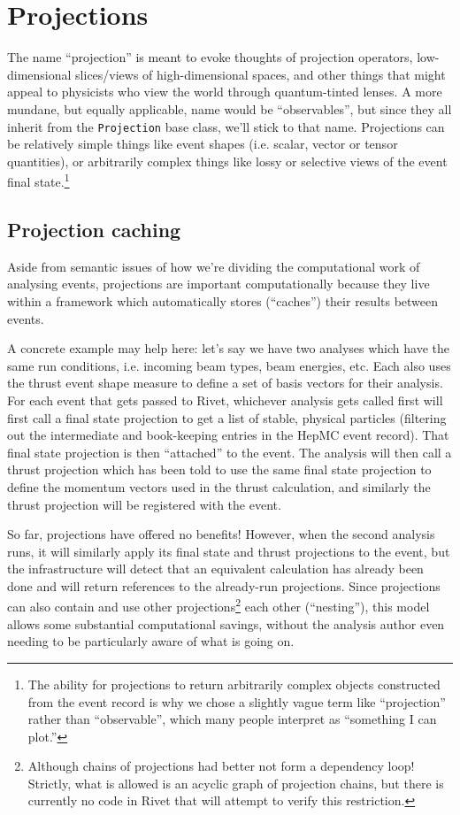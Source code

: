 \documentclass{JHEP3}
\newcommand{\kbd}[1]{\texttt{#1}\xspace}
\begin{document}
\section{Projections}
The name ``projection'' is meant to evoke thoughts of
projection operators, low-dimensional slices/views of high-dimensional spaces,
and other things that might appeal to physicists who view the world through
quantum-tinted lenses. A more mundane, but equally applicable, name would be
``observables'', but since they all inherit from the \kbd{Projection} base
class, we'll stick to that name. Projections can be relatively simple things
like event shapes (i.e. scalar, vector or tensor quantities), or arbitrarily
complex things like lossy or selective views of the event final
state.\footnote{The ability for projections to return arbitrarily complex objects
  constructed from the event record is why we chose a slightly vague term like
  ``projection'' rather than ``observable'', which many people interpret as
  ``something I can plot.''}

\subsection{Projection caching}
Aside from semantic issues of how we're dividing the computational work of
analysing events, projections are important computationally because they live
within a framework which automatically stores (``caches'') their results between
events.

A concrete example may help here: let's say we have two analyses which
have the same run conditions, i.e. incoming beam types, beam energies, etc. Each
also uses the thrust event shape measure to define a set of basis vectors for
their analysis. For each event that gets passed to Rivet, whichever analysis
gets called first will first call a final state projection to get a list of
stable, physical particles (filtering out the intermediate and book-keeping
entries in the HepMC event record). That final state projection is then
``attached'' to the event. The analysis will then call a thrust projection which
has been told to use the same final state projection to define the momentum
vectors used in the thrust calculation, and similarly the thrust projection will
be registered with the event.

So far, projections have offered no benefits! However, when the second analysis
runs, it will similarly apply its final state and thrust projections to the
event, but the infrastructure will detect that an equivalent calculation has
already been done and will return references to the already-run
projections. Since projections can also contain and use other
projections\footnote{Although chains of projections had better not form a
  dependency loop! Strictly, what is allowed is an acyclic graph of projection
  chains, but there is currently no code in Rivet that will attempt to verify
  this restriction.} each other (``nesting''), this model allows some substantial
computational savings, without the analysis author even needing to be
particularly aware of what is going on.
\end{document}
